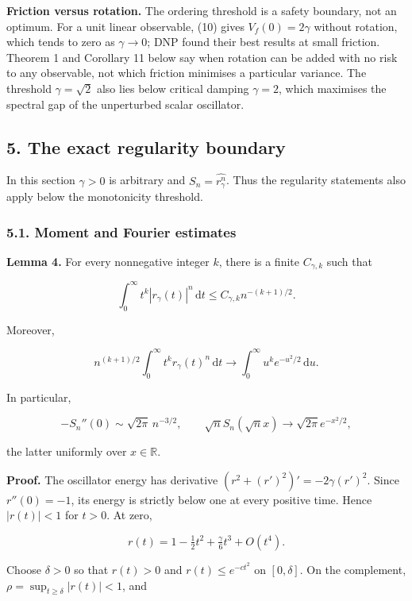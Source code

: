 \documentclass[
  british,
  11pt,
  a4paper,
]{article}
\begin{document}
\textbf{Friction versus rotation.} The ordering threshold is a safety
boundary, not an optimum. For a unit linear observable, (10) gives
\(V_f(0)=2\gamma\) without rotation, which tends to zero as
\(\gamma\to0\); DNP found their best results at small friction. Theorem
1 and Corollary 11 below say when rotation can be added with no risk to
any observable, not which friction minimises a particular variance. The
threshold \(\gamma=\sqrt2\) also lies below critical damping
\(\gamma=2\), which maximises the spectral gap of the unperturbed scalar
oscillator.

\subsection{5. The exact regularity
boundary}\label{the-exact-regularity-boundary}

In this section \(\gamma>0\) is arbitrary and
\(S_n=\widehat{r_\gamma^n}\). Thus the regularity statements also apply
below the monotonicity threshold.

\subsubsection{5.1. Moment and Fourier
estimates}\label{moment-and-fourier-estimates}

\textbf{Lemma 4.} For every nonnegative integer \(k\), there is a finite
\(C_{\gamma,k}\) such that

\[
\int_0^\infty t^k|r_\gamma(t)|^n\,\mathrm dt
\le C_{\gamma,k}n^{-(k+1)/2}. \tag{11}
\]

Moreover,

\[
n^{(k+1)/2}\int_0^\infty t^kr_\gamma(t)^n\,\mathrm dt
\longrightarrow\int_0^\infty u^ke^{-u^2/2}\,\mathrm du. \tag{12}
\]

In particular,

\[
-S_n''(0)\sim\sqrt{2\pi}\,n^{-3/2},\qquad
\sqrt n S_n(\sqrt n x)\longrightarrow\sqrt{2\pi}e^{-x^2/2}, \tag{13}
\]

the latter uniformly over \(x\in\mathbb R\).

\textbf{Proof.} The oscillator energy has derivative
\((r^2+(r')^2)'=-2\gamma(r')^2\). Since \(r''(0)=-1\), its energy is
strictly below one at every positive time. Hence \(|r(t)|<1\) for
\(t>0\). At zero,

\[
r(t)=1-\tfrac12t^2+\tfrac\gamma6t^3+O(t^4).
\]

Choose \(\delta>0\) so that \(r(t)>0\) and \(r(t)\le e^{-ct^2}\) on
\([0,\delta]\). On the complement, \(\rho=\sup_{t\ge\delta}|r(t)|<1\),
and
\end{document}
